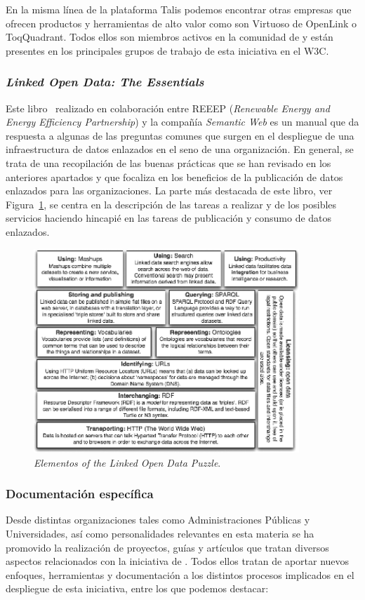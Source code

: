 En la misma línea de la plataforma Talis podemos encontrar otras empresas que ofrecen productos y herramientas
de alto valor como son Virtuoso de OpenLink o ToqQuadrant. Todos ellos son miembros activos en la comunidad
de \linkeddata y están presentes en los principales grupos de trabajo de esta iniciativa en el \gls{W3C}.
 
\subsubsection{\textit{Linked Open Data: The Essentials}}\label{linked-data-spec}
Este libro~\cite{Bauer2012} realizado en colaboración entre \gls{REEEP} (\textit{Renewable Energy and Energy Efficiency Partnership}) y la compañía \textit{Semantic Web}
es un manual que da respuesta a algunas de las preguntas comunes que surgen en el despliegue de una infraestructura de datos enlazados
en el seno de una organización. En general, se trata de una recopilación de las buenas prácticas que se han revisado
en los anteriores apartados y que focaliza en los beneficios de la publicación de datos enlazados para las
organizaciones. La parte más destacada de este libro, ver Figura~\ref{fig:lod-essentials}, se centra en la descripción de las tareas
a realizar y de los posibles servicios haciendo hincapié en las tareas de publicación y consumo de datos enlazados.

\begin{figure}[!htb]
\centering
	\includegraphics[width=10cm]{images/phd/lod-essentials}
\caption{\textit{Elementos of the Linked Open Data Puzzle}.}
\label{fig:lod-essentials}
\end{figure}


\subsubsection{Documentación específica}\label{linked-data-spec}
Desde distintas organizaciones tales como Administraciones Públicas y Universidades,
así como personalidades relevantes en esta materia se ha promovido la realización de proyectos, guías y artículos que tratan diversos aspectos
relacionados con la iniciativa de \linkeddata. Todos ellos tratan de aportar nuevos enfoques, herramientas y documentación
a los distintos procesos implicados en el despliegue de esta iniciativa, entre los que podemos destacar:


